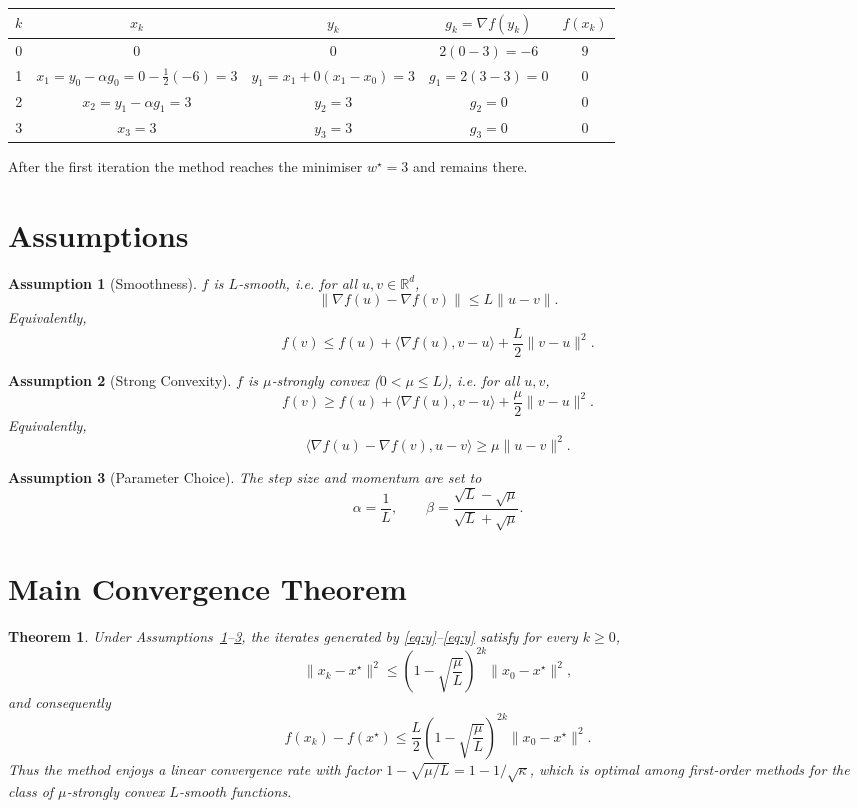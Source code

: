 \documentclass{article}
\newtheorem{theorem}{Theorem}[section]
\newtheorem{assumption}{Assumption}[section]
\begin{document}
\begin{center}
\begin{tabular}{c|c|c|c|c}
$k$ & $x_k$ & $y_k$ & $g_k=\nabla f(y_k)$ & $f(x_k)$\\\hline
0 & $0$ & $0$ & $2(0-3)=-6$ & $9$\\
1 & $x_1 = y_0-\alpha g_0 = 0-\tfrac12(-6)=3$ & $y_1 = x_1+0(x_1-x_0)=3$ & $g_1=2(3-3)=0$ & $0$\\
2 & $x_2 = y_1-\alpha g_1 = 3$ & $y_2 =3$ & $g_2=0$ & $0$\\
3 & $x_3 =3$ & $y_3=3$ & $g_3=0$ & $0$\\
\end{tabular}
\end{center}
After the first iteration the method reaches the minimiser $w^\star=3$ and
remains there.

\newpage
\section*{Assumptions}
\begin{assumption}[Smoothness]\label{ass:smooth}
$f$ is $L$‑smooth, i.e. for all $u,v\in\mathbb{R}^d$,
\[
\|\nabla f(u)-\nabla f(v)\|\le L\|u-v\|.
\]
Equivalently,
\[
f(v)\le f(u)+\langle\nabla f(u),v-u\rangle+\frac{L}{2}\|v-u\|^2.
\]
\end{assumption}
\begin{assumption}[Strong Convexity]\label{ass:strong}
$f$ is $\mu$‑strongly convex ($0<\mu\le L$), i.e. for all $u,v$,
\[
f(v)\ge f(u)+\langle\nabla f(u),v-u\rangle+\frac{\mu}{2}\|v-u\|^2.
\]
Equivalently,
\[
\langle\nabla f(u)-\nabla f(v),u-v\rangle\ge \mu\|u-v\|^2.
\]
\end{assumption}
\begin{assumption}[Parameter Choice]\label{ass:param}
The step size and momentum are set to
\[
\alpha = \frac{1}{L},\qquad 
\beta = \frac{\sqrt{L}-\sqrt{\mu}}{\sqrt{L}+\sqrt{\mu}}.
\]
\end{assumption}

\section*{Main Convergence Theorem}
\begin{theorem}\label{thm:linear}
Under Assumptions~\ref{ass:smooth}--\ref{ass:param}, the iterates generated by
\eqref{eq:y}–\eqref{eq:y} satisfy for every $k\ge 0$,
\[
\|x_{k}-x^\star\|^2\le
\left(1-\sqrt{\frac{\mu}{L}}\right)^{2k}\|x_{0}-x^\star\|^2,
\]
and consequently
\[
f(x_k)-f(x^\star)\le
\frac{L}{2}\left(1-\sqrt{\frac{\mu}{L}}\right)^{2k}\|x_{0}-x^\star\|^2.
\]
Thus the method enjoys a linear convergence rate with factor
$1-\sqrt{\mu/L}=1-1/\sqrt{\kappa}$, which is optimal among first‑order
methods for the class of $\mu$‑strongly convex $L$‑smooth functions.
\end{theorem}
\end{document}
